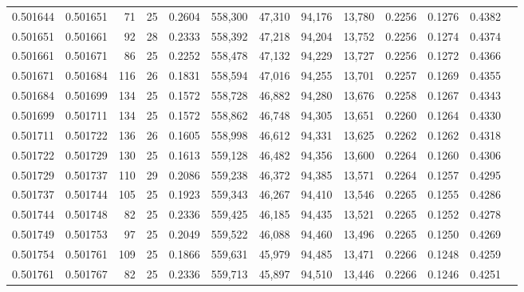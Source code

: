 \begin{tabular}{rrrrrrrrrrrrr}
0.501644 & 0.501651 &  71 &  25 &                                     0.2604 & 558,300 &  47,310 &  94,176 &  13,780 & 0.2256 & 0.1276 & 0.4382 \\
0.501651 & 0.501661 &  92 &  28 &                                     0.2333 & 558,392 &  47,218 &  94,204 &  13,752 & 0.2256 & 0.1274 & 0.4374 \\
0.501661 & 0.501671 &  86 &  25 &                                     0.2252 & 558,478 &  47,132 &  94,229 &  13,727 & 0.2256 & 0.1272 & 0.4366 \\
0.501671 & 0.501684 & 116 &  26 &                                     0.1831 & 558,594 &  47,016 &  94,255 &  13,701 & 0.2257 & 0.1269 & 0.4355 \\
0.501684 & 0.501699 & 134 &  25 &                                     0.1572 & 558,728 &  46,882 &  94,280 &  13,676 & 0.2258 & 0.1267 & 0.4343 \\
0.501699 & 0.501711 & 134 &  25 &                                     0.1572 & 558,862 &  46,748 &  94,305 &  13,651 & 0.2260 & 0.1264 & 0.4330 \\
0.501711 & 0.501722 & 136 &  26 &                                     0.1605 & 558,998 &  46,612 &  94,331 &  13,625 & 0.2262 & 0.1262 & 0.4318 \\
0.501722 & 0.501729 & 130 &  25 &                                     0.1613 & 559,128 &  46,482 &  94,356 &  13,600 & 0.2264 & 0.1260 & 0.4306 \\
0.501729 & 0.501737 & 110 &  29 &                                     0.2086 & 559,238 &  46,372 &  94,385 &  13,571 & 0.2264 & 0.1257 & 0.4295 \\
0.501737 & 0.501744 & 105 &  25 &                                     0.1923 & 559,343 &  46,267 &  94,410 &  13,546 & 0.2265 & 0.1255 & 0.4286 \\
0.501744 & 0.501748 &  82 &  25 &                                     0.2336 & 559,425 &  46,185 &  94,435 &  13,521 & 0.2265 & 0.1252 & 0.4278 \\
0.501749 & 0.501753 &  97 &  25 &                                     0.2049 & 559,522 &  46,088 &  94,460 &  13,496 & 0.2265 & 0.1250 & 0.4269 \\
0.501754 & 0.501761 & 109 &  25 &                                     0.1866 & 559,631 &  45,979 &  94,485 &  13,471 & 0.2266 & 0.1248 & 0.4259 \\
0.501761 & 0.501767 &  82 &  25 &                                     0.2336 & 559,713 &  45,897 &  94,510 &  13,446 & 0.2266 & 0.1246 & 0.4251 \\

\end{tabular}
